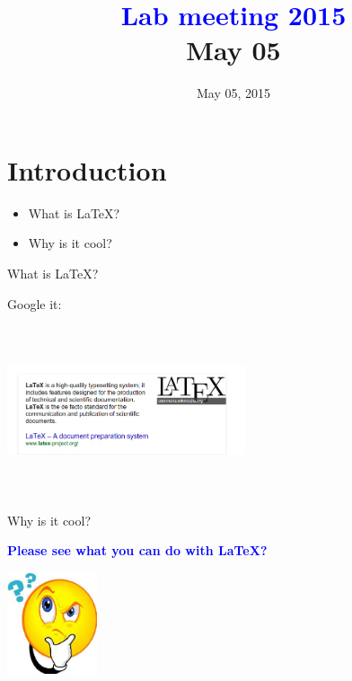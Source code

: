 \documentclass[]{beamer}
\title{\textbf{\textcolor{blue}{Lab meeting 2015}}\\May 05}
\author{ }
\date{May 05, 2015}
\begin{document}
\section{Introduction}

\begin{frame}{}

\begin{itemize}
\item What is \LaTeX?
\item Why is it cool?
\end{itemize}

\end{frame}


\begin{frame}{What is \LaTeX?}

Google it:

\centering
\includegraphics[width = 7cm, height = 5cm]{WhatIsLatex.png}


\end{frame}
\begin{frame}{Why is it cool?}

\centering
\bf{\textcolor{blue}{Please see what you can do with \LaTeX?}}

\vspace{1cm}
\centering
\includegraphics[with = 3cm, height = 3cm]{question-mark-face.jpg}

\end{frame}
\end{document}
